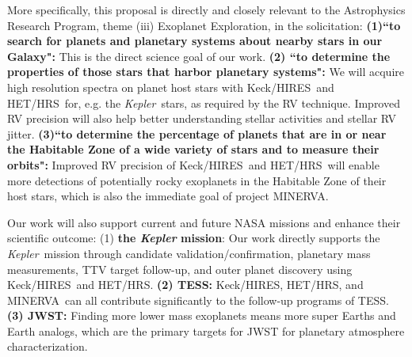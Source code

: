 \documentclass[12pt]{article}
\def\kepler{{\it Kepler}}
\def\minerva{MINERVA}
\def\hrs{HET/HRS}
\def\keck{Keck/HIRES}
\begin{document}
More specifically, this proposal is directly and closely relevant to
the Astrophysics Research Program, theme (iii) Exoplanet Exploration,
in the solicitation: \textbf{(1)``to search for planets and planetary
  systems about nearby stars in our Galaxy":} This is the direct
science goal of our work. \textbf{(2) ``to determine the properties of
  those stars that harbor planetary systems":} We will acquire high
resolution spectra on planet host stars with \keck\ and \hrs\ for,
e.g. the \kepler\ stars, as required by the RV technique. Improved RV
precision will also help better understanding stellar activities and
stellar RV jitter. \textbf{(3)``to determine the percentage of planets
  that are in or near the Habitable Zone of a wide variety of stars
  and to measure their orbits":} Improved RV precision of \keck\ and
\hrs\ will enable more detections of potentially rocky exoplanets in
the Habitable Zone of their host stars, which is also the immediate
goal of project \minerva.

Our work will also support current and future NASA missions and
enhance their scientific outcome: (1) {\bf the \textit{Kepler}
  mission}: Our work directly supports the \kepler\ mission through
candidate validation/confirmation, planetary mass measurements, TTV
target follow-up, and outer planet discovery using \keck\ and
\hrs. {\bf (2) TESS:} \keck, \hrs, and \minerva\ can all contribute
significantly to the follow-up programs of TESS. {\bf (3) JWST:}
Finding more lower mass exoplanets means more super Earths and Earth
analogs, which are the primary targets for JWST for planetary
atmosphere characterization.



\vspace{-3pt}
{\small %
 }
\end{document}
